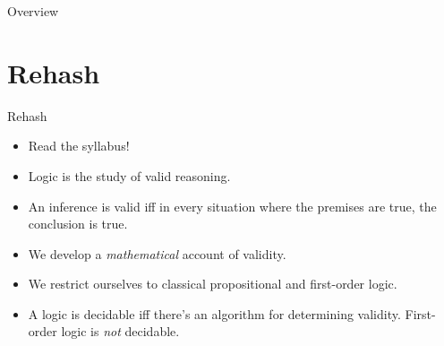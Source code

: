 \setcounter{framenumber}{24}
\begin{frame}
	\maketitle
\end{frame}

\begin{frame}{Overview}
\tableofcontents
\end{frame}

\section{Rehash}
\begin{frame}{Rehash}

\begin{itemize}

	\item \alert{Read the syllabus!}
	
	\item Logic is the study of valid reasoning.
	
	\item An inference is valid iff in every situation where the premises are true, the conclusion is true.
	
	\item \alert{We develop a \emph{mathematical} account of validity.}
	
	\item We restrict ourselves to classical propositional and first-order logic.
	
	\item A logic is decidable iff there's an algorithm for determining validity. First-order logic is \emph{not} decidable.

\end{itemize}

\end{frame}

